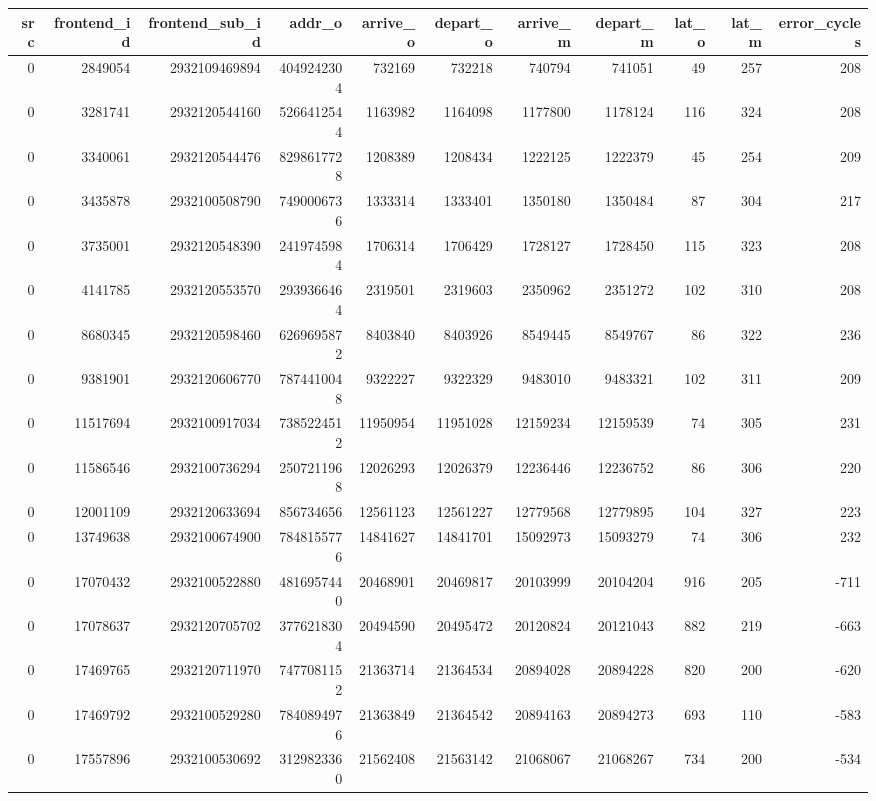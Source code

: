 \begin{tabular}{rrrrrrrrrrr}
\toprule
src & frontend\_id & frontend\_sub\_id & addr\_o & arrive\_o & depart\_o & arrive\_m & depart\_m & lat\_o & lat\_m & error\_cycles \\
\midrule
0 & 2849054 & 2932109469894 & 4049242304 & 732169 & 732218 & 740794 & 741051 & 49 & 257 & 208 \\
0 & 3281741 & 2932120544160 & 5266412544 & 1163982 & 1164098 & 1177800 & 1178124 & 116 & 324 & 208 \\
0 & 3340061 & 2932120544476 & 8298617728 & 1208389 & 1208434 & 1222125 & 1222379 & 45 & 254 & 209 \\
0 & 3435878 & 2932100508790 & 7490006736 & 1333314 & 1333401 & 1350180 & 1350484 & 87 & 304 & 217 \\
0 & 3735001 & 2932120548390 & 2419745984 & 1706314 & 1706429 & 1728127 & 1728450 & 115 & 323 & 208 \\
0 & 4141785 & 2932120553570 & 2939366464 & 2319501 & 2319603 & 2350962 & 2351272 & 102 & 310 & 208 \\
0 & 8680345 & 2932120598460 & 6269695872 & 8403840 & 8403926 & 8549445 & 8549767 & 86 & 322 & 236 \\
0 & 9381901 & 2932120606770 & 7874410048 & 9322227 & 9322329 & 9483010 & 9483321 & 102 & 311 & 209 \\
0 & 11517694 & 2932100917034 & 7385224512 & 11950954 & 11951028 & 12159234 & 12159539 & 74 & 305 & 231 \\
0 & 11586546 & 2932100736294 & 2507211968 & 12026293 & 12026379 & 12236446 & 12236752 & 86 & 306 & 220 \\
0 & 12001109 & 2932120633694 & 856734656 & 12561123 & 12561227 & 12779568 & 12779895 & 104 & 327 & 223 \\
0 & 13749638 & 2932100674900 & 7848155776 & 14841627 & 14841701 & 15092973 & 15093279 & 74 & 306 & 232 \\
0 & 17070432 & 2932100522880 & 4816957440 & 20468901 & 20469817 & 20103999 & 20104204 & 916 & 205 & -711 \\
0 & 17078637 & 2932120705702 & 3776218304 & 20494590 & 20495472 & 20120824 & 20121043 & 882 & 219 & -663 \\
0 & 17469765 & 2932120711970 & 7477081152 & 21363714 & 21364534 & 20894028 & 20894228 & 820 & 200 & -620 \\
0 & 17469792 & 2932100529280 & 7840894976 & 21363849 & 21364542 & 20894163 & 20894273 & 693 & 110 & -583 \\
0 & 17557896 & 2932100530692 & 3129823360 & 21562408 & 21563142 & 21068067 & 21068267 & 734 & 200 & -534 \\

\end{tabular}
